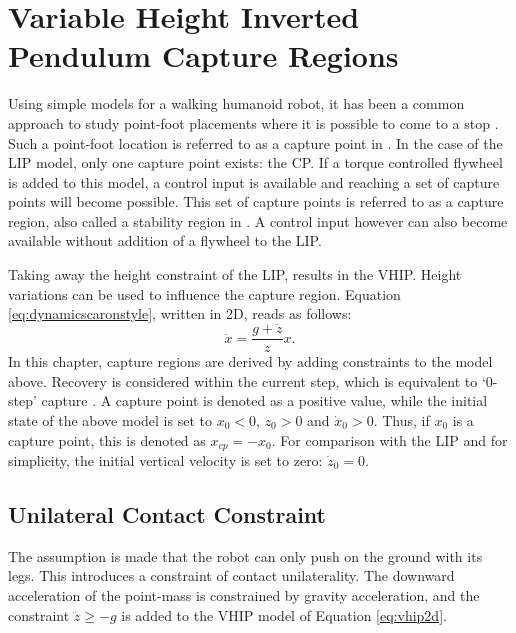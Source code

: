%
\chapter{Variable Height Inverted Pendulum Capture Regions}\label{chap:regions}
Using simple models for a walking humanoid robot, it has been a common approach to study point-foot placements where it is possible to come to a stop \cite{pratt2006capture, stephens2007humanoid, koolen2012capturability}. Such a point-foot location is referred to as a capture point in \cite{pratt2006capture}. In the case of the \ac{LIP} model, only one capture point exists: the \ac{CP}. If a torque controlled flywheel is added to this model, a control input is available and reaching a set of capture points will become possible. This set of capture points is referred to as a capture region, also called a stability region in \cite{stephens2007humanoid}. A control input however can also become available without addition of a flywheel to the \ac{LIP}.


Taking away the height constraint of the \ac{LIP}, results in the \ac{VHIP}. Height variations can be used to influence the capture region. Equation \eqref{eq:dynamicscaronstyle}, written in \ac{2D}, reads as follows:
\begin{equation}
	\label{eq:vhip2d}
	\ddot{x}=\frac{g+\ddot{z}}{z}x.
\end{equation}	
In this chapter, capture regions are derived by adding constraints to the model above. Recovery is considered within the current step, which is equivalent to `0-step' capture \cite{koolen2012capturability}. A capture point is denoted as a positive value, while the initial state of the above model is set to $x_0<0$, $z_0>0$ and $\dot{x}_0>0$. Thus, if $x_0$ is a capture point, this is denoted as $x_{cp}=-x_0$. For comparison with the \ac{LIP} and for simplicity, the initial vertical velocity is set to zero: $\dot{z}_0=0$.



\section{Unilateral Contact Constraint}
The assumption is made that the robot can only push on the ground with its legs. This introduces a constraint of contact unilaterality. The downward acceleration of the point-mass is constrained by gravity acceleration, and the constraint $\ddot{z} \geq -g$ is added to the \ac{VHIP} model of Equation \eqref{eq:vhip2d}.

